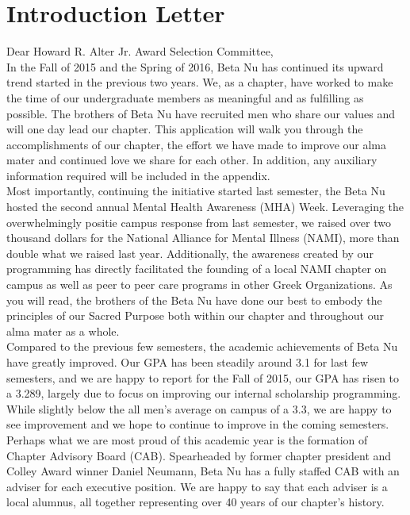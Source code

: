 \chapter{Introduction Letter}

Dear Howard R. Alter Jr. Award Selection Committee, \\

In the Fall of 2015 and the Spring of 2016, Beta Nu has continued its upward trend started in the previous two years. We, as a chapter, have worked to make the time of our undergraduate members as meaningful and as fulfilling as possible.  The brothers of Beta Nu have recruited men who share our values and will one day lead our chapter. This application will walk you through the accomplishments of our chapter, the effort we have made to improve our alma mater and continued love we share for each other. In addition, any auxiliary information required will be included in the appendix. \\

Most importantly, continuing the initiative started last semester, the Beta Nu hosted the second annual Mental Health Awareness (MHA) Week. Leveraging the overwhelmingly positie campus response from last semester, we raised over two thousand dollars for the National Alliance for Mental Illness (NAMI), more than double what we raised last year. Additionally, the awareness created by our programming has directly facilitated the founding of a local NAMI chapter on campus as well as peer to peer care programs in other Greek Organizations. As you will read, the brothers of the Beta Nu have done our best to embody the principles of our Sacred Purpose both within our chapter and throughout our alma mater as a whole. \\

Compared to the previous few semesters, the academic achievements of Beta Nu have greatly improved. Our GPA has been steadily around 3.1 for last few semesters, and we are happy to report for the Fall of 2015, our GPA has risen to a 3.289, largely due to focus on improving our internal scholarship programming. While slightly below the all men’s average on campus of a 3.3, we are happy to see improvement and we hope to continue to improve in the coming semesters. \\

Perhaps what we are most proud of this academic year is the formation of Chapter Advisory Board (CAB). Spearheaded by former chapter president and Colley Award winner Daniel Neumann, Beta Nu has a fully staffed CAB with an adviser for each executive position. We are happy to say that each adviser is a local alumnus, all together representing over 40 years of our chapter’s history. \\


